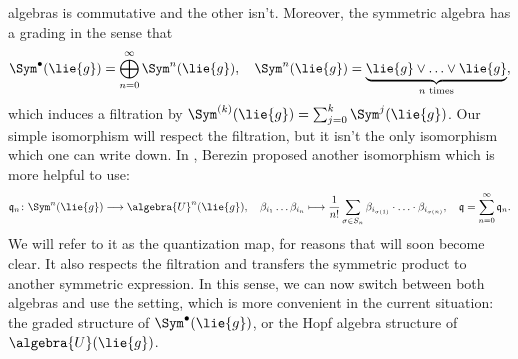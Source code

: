 algebras is commutative and the other isn't. Moreover, the symmetric algebra 
has a grading in the sense that
\begin{equation*}
	\Sym^{\bullet}(\lie{g})
	=
	\bigoplus\limits_{n = 0}^{\infty}
	\Sym^n(\lie{g})
	, \quad
	\Sym^n(\lie{g})
	=
	\underbrace{
		\lie{g} \vee \ldots \vee \lie{g}
	}_{
		n \text{ times}
	},
\end{equation*}
which induces a filtration by $\Sym^{(k)}(\lie{g}) = \sum_{j=0}^k 
\Sym^j(\lie{g})$. Our simple isomorphism will respect the filtration, but it 
isn't the only isomorphism which one can write down. In \cite{berezin:1971a}, 
Berezin proposed another isomorphism which is more helpful to use:
\begin{equation}
	\label{Alg:BerezinQuantization}
	\mathfrak{q}_n
	\colon
	\Sym^n(\lie{g})
	\longrightarrow
	\algebra{U}^n(\lie{g})
	, \quad
	\beta_{i_1} \ldots \beta_{i_n}
	\longmapsto
	\frac{1}{n!}
	\sum\limits_{\sigma \in S_n}
	\beta_{i_{\sigma(1)}} 
	\cdot \ldots \cdot
	\beta_{i_{\sigma(n)}}
	, \quad
	\mathfrak{q}
	=
	\sum\limits_{n = 0}^{\infty}
	\mathfrak{q}_n.
\end{equation}
We will refer to it as the quantization map, for reasons that will soon become 
clear. It also respects the filtration and transfers the symmetric product to 
another symmetric expression. In this sense, we can now switch between both 
algebras and use the setting, which is more convenient in the current 
situation: the graded structure of $\Sym^{\bullet}(\lie{g})$, or the Hopf 
algebra structure of $\algebra{U}(\lie{g})$.


